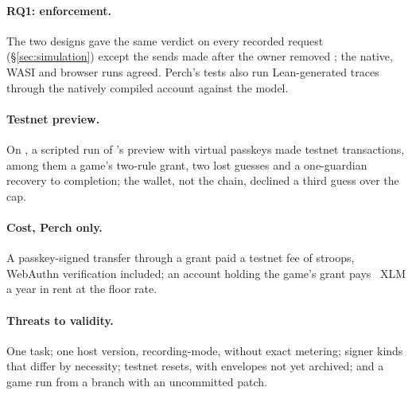 \paragraph{RQ1: enforcement.} The two designs gave the same verdict on every
recorded request (\S\ref{sec:simulation}) except the
 sends made after the owner removed
; the native, WASI and browser runs agreed. Perch's tests
also run  Lean-generated traces through the natively
compiled account against the model.

\paragraph{Testnet preview.} On , a scripted run of
's preview with virtual passkeys made
 testnet transactions, among them a game's two-rule
grant, two lost guesses and a one-guardian recovery to completion; the wallet,
not the chain, declined a third guess over the cap.

\paragraph{Cost, Perch only.} A passkey-signed transfer through a grant paid a
testnet fee of  stroops, WebAuthn verification included;
an account holding the game's grant pays ~XLM a year
in rent at the floor rate.

\paragraph{Threats to validity.} One task; one host version, recording-mode, without
exact metering; signer kinds that differ by necessity; testnet resets, with
envelopes not yet archived; and a game run from a branch with an uncommitted
patch.
